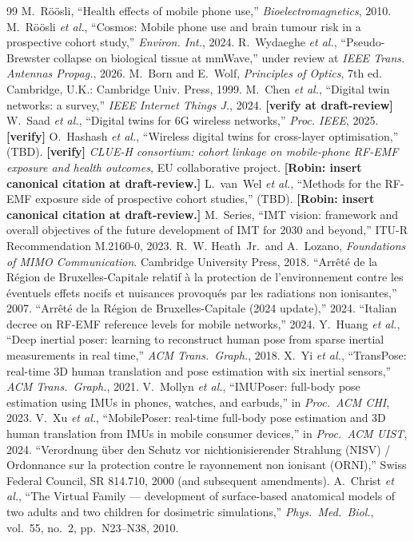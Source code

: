 \documentclass[journal,twocolumn,10pt]{IEEEtran}
\theoremstyle{plain}
\theoremstyle{definition}
\theoremstyle{remark}
\begin{document}
\begin{thebibliography}{99}
 M.~R\"o\"osli, ``Health effects of mobile phone
use,'' \emph{Bioelectromagnetics}, 2010.
 M.~R\"o\"osli \emph{et al.}, ``Cosmos: Mobile
phone use and brain tumour risk in a prospective cohort study,''
\emph{Environ. Int.}, 2024.
 R.~Wydaeghe \emph{et al.}, ``Pseudo-Brewster
collapse on biological tissue at mmWave,'' under review at
\emph{IEEE Trans. Antennas Propag.}, 2026.
 M.~Born and E.~Wolf, \emph{Principles of Optics},
7th ed. Cambridge, U.K.: Cambridge Univ. Press, 1999.
 M.~Chen \emph{et al.}, ``Digital twin
networks: a survey,'' \emph{IEEE Internet Things J.}, 2024.
\textbf{[verify at draft-review]}
 W.~Saad \emph{et al.}, ``Digital twins for
6G wireless networks,'' \emph{Proc. IEEE}, 2025. \textbf{[verify]}
 O.~Hashash \emph{et al.}, ``Wireless
digital twins for cross-layer optimisation,'' (TBD).
\textbf{[verify]}
 \emph{CLUE-H consortium: cohort linkage on
mobile-phone RF-EMF exposure and health outcomes,} EU collaborative
project. \textbf{[Robin: insert canonical citation at draft-review.]}
 L.~van~Wel \emph{et al.}, ``Methods for the
RF-EMF exposure side of prospective cohort studies,'' (TBD).
\textbf{[Robin: insert canonical citation at draft-review.]}
 M.~Series, ``IMT vision: framework and overall
objectives of the future development of IMT for 2030 and beyond,''
ITU-R Recommendation M.2160-0, 2023.
 R.~W. Heath~Jr.\ and A.~Lozano,
\emph{Foundations of MIMO Communication}. Cambridge University
Press, 2018.
 ``Arr\^et\'e de la R\'egion de
Bruxelles-Capitale relatif \`a la protection de l'environnement
contre les \'eventuels effets nocifs et nuisances provoqu\'es par
les radiations non ionisantes,'' 2007.
 ``Arr\^et\'e de la R\'egion de
Bruxelles-Capitale (2024 update),'' 2024.
 ``Italian decree on RF-EMF reference levels for
mobile networks,'' 2024.
 Y.~Huang \emph{et al.}, ``Deep inertial poser:
learning to reconstruct human pose from sparse inertial
measurements in real time,'' \emph{ACM Trans.\ Graph.}, 2018.
 X.~Yi \emph{et al.}, ``TransPose: real-time
3D human translation and pose estimation with six inertial
sensors,'' \emph{ACM Trans.\ Graph.}, 2021.
 V.~Mollyn \emph{et al.}, ``IMUPoser:
full-body pose estimation using IMUs in phones, watches, and
earbuds,'' in \emph{Proc.\ ACM CHI}, 2023.
 V.~Xu \emph{et al.}, ``MobilePoser:
real-time full-body pose estimation and 3D human translation
from IMUs in mobile consumer devices,'' in \emph{Proc.\ ACM
UIST}, 2024.
 ``Verordnung \"uber den Schutz vor
nichtionisierender Strahlung (NISV) / Ordonnance sur la
protection contre le rayonnement non ionisant (ORNI),''
Swiss Federal Council, SR 814.710, 2000 (and subsequent
amendments).
 A.~Christ \emph{et al.}, ``The Virtual
Family --- development of surface-based anatomical models of
two adults and two children for dosimetric simulations,''
\emph{Phys.\ Med.\ Biol.}, vol.~55, no.~2, pp.~N23--N38, 2010.
\end{thebibliography}
\end{document}
